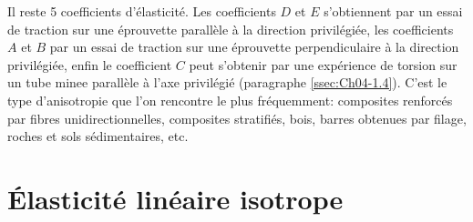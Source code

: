 Il reste 5 coefficients d'élasticité.
Les coefficients $D$ et $E$ s'obtiennent par un essai de traction sur une éprouvette parallèle à la direction privilégiée, les coefficients $A$ et $B$ par un essai de traction sur une éprouvette perpendiculaire à la direction privilégiée, enfin le coefficient $C$ peut s'obtenir par une expérience de torsion sur un tube minee parallèle à l'axe privilégié (paragraphe \ref{ssec:Ch04-1.4}).
C'est le type d'anisotropie que l'on rencontre le plus fréquemment: composites renforcés par fibres unidirectionnelles, composites stratifiés, bois, barres obtenues par filage, roches et sols sédimentaires, etc.

\section{Élasticité linéaire isotrope}
